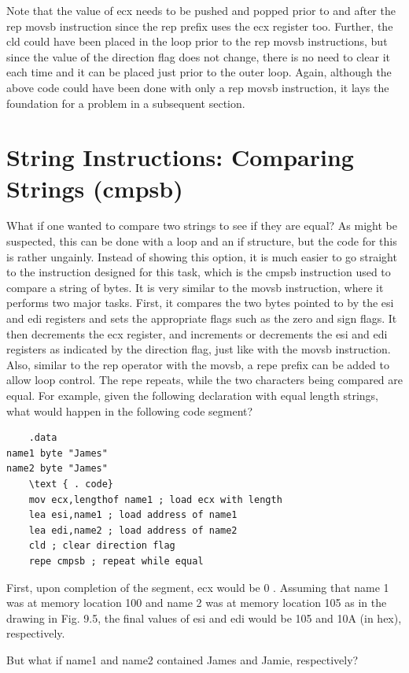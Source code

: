 \documentclass[10pt]{book}
\begin{document}
Note that the value of ecx needs to be pushed and popped prior to and after the rep movsb instruction since the rep prefix uses the ecx register too. Further, the cld could have been placed in the loop prior to the rep movsb instructions, but since the value of the direction flag does not change, there is no need to clear it each time and it can be placed just prior to the outer loop. Again, although the above code could have been done with only a rep movsb instruction, it lays the foundation for a problem in a subsequent section.

\section{String Instructions: Comparing Strings (cmpsb)}
What if one wanted to compare two strings to see if they are equal? As might be suspected, this can be done with a loop and an if structure, but the code for this is rather ungainly. Instead of showing this option, it is much easier to go straight to the instruction designed for this task, which is the cmpsb instruction used to compare a string of bytes. It is very similar to the movsb instruction, where it performs two major tasks. First, it compares the two bytes pointed to by the esi and edi registers and sets the appropriate flags such as the zero and sign flags. It then decrements the ecx register, and increments or decrements the esi and edi registers as indicated by the direction flag, just like with the movsb instruction. Also, similar to the rep operator with the movsb, a repe prefix can be added to allow loop control. The repe repeats, while the two characters being compared are equal. For example, given the following declaration with equal length strings, what would happen in the following code segment?

\begin{verbatim}
    .data
name1 byte "James"
name2 byte "James"
    \text { . code}
    mov ecx,lengthof name1 ; load ecx with length
    lea esi,name1 ; load address of name1
    lea edi,name2 ; load address of name2
    cld ; clear direction flag
    repe cmpsb ; repeat while equal
\end{verbatim}

First, upon completion of the segment, ecx would be 0 . Assuming that name 1 was at memory location 100 and name 2 was at memory location 105 as in the drawing in Fig. 9.5, the final values of esi and edi would be 105 and 10A (in hex), respectively.

But what if name1 and name2 contained James and Jamie, respectively?
\end{document}
